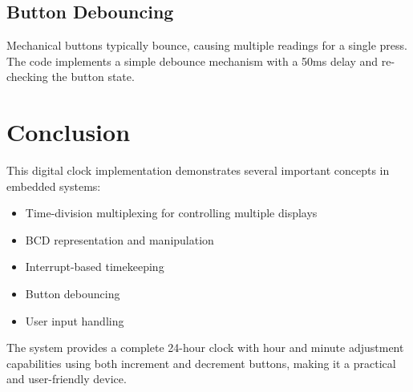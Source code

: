 \documentclass[12pt]{article}
\begin{document}
\subsection{Button Debouncing}
Mechanical buttons typically bounce, causing multiple readings for a single press. The code implements a simple debounce mechanism with a 50ms delay and re-checking the button state.

\section{Conclusion}
This digital clock implementation demonstrates several important concepts in embedded systems:
\begin{itemize}
    \item Time-division multiplexing for controlling multiple displays
    \item BCD representation and manipulation
    \item Interrupt-based timekeeping
    \item Button debouncing
    \item User input handling
\end{itemize}

The system provides a complete 24-hour clock with hour and minute adjustment capabilities using both increment and decrement buttons, making it a practical and user-friendly device.
\end{document}
